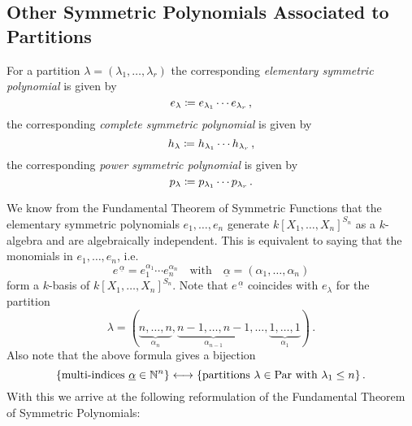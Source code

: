 




\subsection{Other Symmetric Polynomials Associated to Partitions}


\begin{definition}
  For a partition $\lambda = (\lambda_1, \dotsc, \lambda_r)$ the corresponding \emph{elementary symmetric polynomial} is given by
  \[
              e_\lambda
    \coloneqq  e_{\lambda_1} \dotsm e_{\lambda_r} \,,
  \]
  the corresponding \emph{complete symmetric polynomial} is given by
  \[
              h_\lambda
    \coloneqq  h_{\lambda_1} \dotsm h_{\lambda_r} \,,
  \]
  the corresponding \emph{power symmetric polynomial} is given by
  \[
              p_\lambda
    \coloneqq  p_{\lambda_1} \dotsm p_{\lambda_r} \,.
  \]
\end{definition}


\begin{fluff}
  We know from the Fundamental Theorem of Symmetric Functions that the elementary symmetric polynomials $e_1, \dotsc, e_n$ generate $k[X_1, \dotsc, X_n]^{S_n}$ as a $k$-algebra and are algebraically independent. This is equivalent to saying that the monomials in $e_1, \dotsc, e_n$, i.e.\
  \[
      e^{\,\underline{\alpha}}
    = e_1^{\alpha_1} \dotsm e_n^{\alpha_n}
    \quad\text{with}\quad
      \underline{\alpha}
    = (\alpha_1, \dotsc, \alpha_n)
  \]
  form a $k$-basis of $k[X_1, \dotsc, X_n]^{S_n}$.
  Note that $e^{\,\underline{\alpha}}$ coincides with $e_\lambda$ for the partition
  \[
    \lambda
  = (
      \underbrace{n, \dotsc, n}_{\alpha_n},
      \underbrace{n-1, \dotsc, n-1}_{\alpha_{n-1}},
      \dotsc,
      \underbrace{1, \dotsc, 1}_{\alpha_1}
    ) \,.
  \]
  Also note that the above formula gives a bijection
  \[
    \{ \text{multi-indices $\underline{\alpha} \in \mathbb{N}^n$} \}
    \longleftrightarrow
    \{ \text{partitions $\lambda \in \operatorname{Par}$ with $\lambda_1 \leq n$} \} \,.
  \]
  With this we arrive at the following reformulation of the Fundamental Theorem of Symmetric Polynomials:
\end{fluff}


